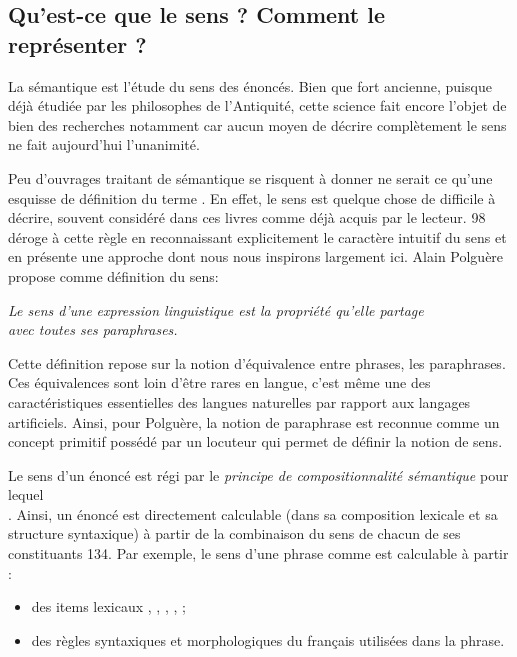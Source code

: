 \subsection[Qu'est-ce que le sens ? Comment le représenter ?]{Qu'est-ce que le sens ? Comment le représenter ?} \label{sec:semantique}

La sémantique est
l'étude du sens des énoncés. Bien que fort ancienne, puisque déjà étudiée par les philosophes de l'Antiquité, cette science fait encore
l'objet de bien des recherches notamment car
aucun moyen de décrire complètement le sens ne fait aujourd'hui
l'unanimité.

Peu d'ouvrages traitant de sémantique se risquent à donner ne serait ce qu'une esquisse de
définition du terme . En effet, le sens est quelque
chose de difficile à décrire, souvent considéré dans
ces livres comme déjà acquis par le lecteur. \citep{Polguere2003}{98}
déroge à cette règle en reconnaissant explicitement le caractère
intuitif du sens et en présente une approche dont nous nous inspirons
largement ici. Alain Polguère propose comme définition du sens:

\vspace{0.3cm}

\begin{center}
  \textit{Le sens d'une expression linguistique est la propriété
    qu'elle partage\\ avec toutes ses paraphrases.}
\end{center}

Cette définition repose sur la notion d'équivalence entre
phrases, les paraphrases. Ces équivalences sont loin d'être rares en
langue, c'est même une des caractéristiques essentielles des langues
naturelles par rapport aux langages artificiels. Ainsi, pour Polguère,
la notion de paraphrase est reconnue comme un concept primitif possédé
par un locuteur qui permet de définir la notion de sens.

Le sens d'un énoncé est régi par le \emph{principe de
  compositionnalité sémantique} pour lequel\\ . Ainsi, un énoncé est
directement calculable (dans sa composition lexicale et sa structure
syntaxique) à partir de la combinaison du sens de chacun de ses
constituants \citep{Polguere2003}{134}. Par exemple, le sens d'une
phrase comme  est calculable à partir
:
\begin{itemize}
  
\item des items lexicaux , ,
  , , ;
  
\item des règles syntaxiques et morphologiques du français utilisées
  dans la phrase.

\end{itemize}

